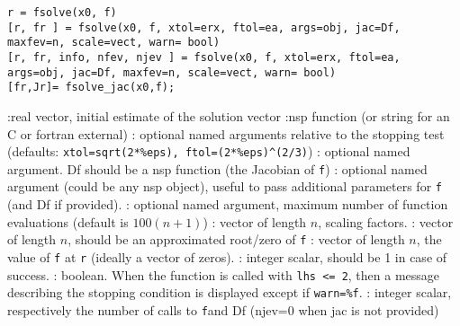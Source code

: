 
\begin{mandesc}
\end{mandesc}

\begin{calling_sequence}
\begin{verbatim}
r = fsolve(x0, f)
[r, fr ] = fsolve(x0, f, xtol=erx, ftol=ea, args=obj, jac=Df, maxfev=n, scale=vect, warn= bool) 
[r, fr, info, nfev, njev ] = fsolve(x0, f, xtol=erx, ftol=ea, args=obj, jac=Df, maxfev=n, scale=vect, warn= bool) 
[fr,Jr]= fsolve_jac(x0,f);
\end{verbatim}
\end{calling_sequence}
\begin{parameters}
  \begin{varlist}
    :real vector, initial estimate of the solution vector
    :nsp function (or string for an C or fortran external)
    : optional named arguments relative to the stopping test (defaults:
    \verb+xtol=sqrt(2*%eps), ftol=(2*%eps)^(2/3)+)
    : optional named argument. Df should be a nsp function (the Jacobian of \verb+f+)
    : optional named argument (could be any nsp object), useful to pass additional parameters for \verb+f+ (and
    Df if provided).
    : optional named argument, maximum number of function evaluations (default is $100(n+1)$)
    : vector of length $n$, scaling factors.
    : vector of length $n$, should be an approximated root/zero of \verb+f+ 
    : vector of length $n$, the value of \verb+f+  at \verb+r+ (ideally a vector of zeros).
    : integer scalar, should be 1 in case of success.
    : boolean. When the function is called with \verb+lhs <= 2+, then a message describing the 
    stopping condition is displayed except if \verb+warn=%f+.
    : integer scalar, respectively the number of calls to \verb+f+and Df (njev=0 when jac is not provided)
  \end{varlist}
\end{parameters}

